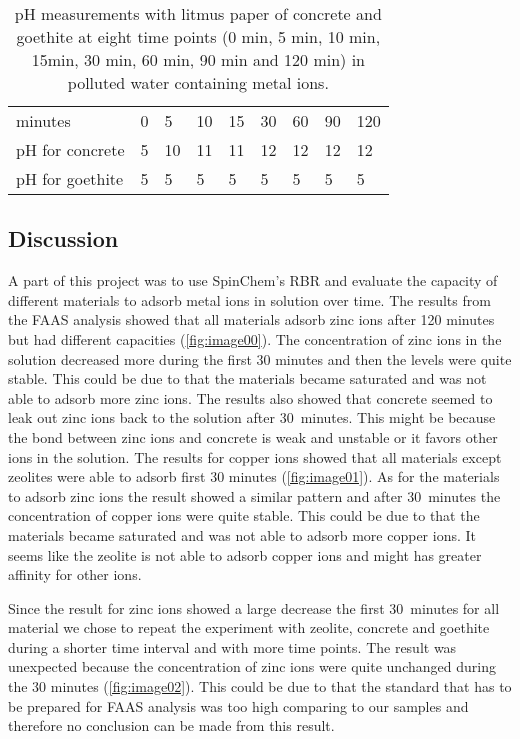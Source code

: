 \begin{table}[H]
\centering
\caption{pH measurements with litmus paper of concrete and goethite at eight
    time points (0 min, 5 min, 10 min, 15min, 30 min, 60 min, 90 min and 120
            min) in polluted water containing metal ions.}
\label{tab:ph}
\begin{tabular}{lllllllll}
minutes         & 0 & 5 & 10 & 15 & 30 & 60 & 90 & 120 \\
pH for concrete & 5 & 10 & 11 & 11 & 12 & 12 & 12 & 12 \\
pH for goethite & 5 & 5 & 5 & 5 & 5 & 5 & 5 & 5
\end{tabular}
\end{table}

\subsection{Discussion}
A part of this project was to use SpinChem\textsuperscript{\textregistered}'s RBR and evaluate the capacity of different materials to adsorb metal ions in solution over time. The results from the FAAS analysis showed that all materials adsorb zinc ions after 120 minutes but had different capacities (\cref{fig:image00}). The concentration of zinc ions in the solution decreased more during the first 30 minutes and then the levels were quite stable. This could be due to that the materials became saturated and was not able to adsorb more zinc ions. The results also showed that concrete seemed to leak out zinc ions back to the solution after 30~minutes. This might be because the bond between zinc ions and concrete is weak and unstable or it favors other ions in the solution. The results for copper ions showed that all materials except zeolites were able to adsorb first 30 minutes (\cref{fig:image01}). As for the materials to adsorb zinc ions the result showed a similar pattern and after 30~minutes the concentration of copper ions were quite stable. This could be due to that the materials became saturated and was not able to adsorb more copper ions. It seems like the zeolite is not able to adsorb copper ions and might has greater affinity for other ions. 

Since the result for zinc ions showed a large decrease the first 30~minutes for all material we chose to repeat the experiment with zeolite, concrete and goethite during a shorter time interval and with more time points. The result was unexpected because the concentration of zinc ions were quite unchanged during the 30 minutes (\cref{fig:image02}). This could be due to that the standard that has to be prepared for FAAS analysis was too high comparing to our samples and therefore no conclusion can be made from this result. 

